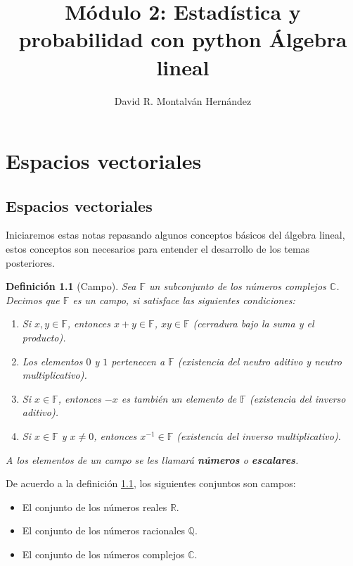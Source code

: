 \documentclass[11pt]{report}
\title{Módulo 2: Estadística y probabilidad con python \newline Álgebra lineal}
\author{David R. Montalván Hernández}
\date{}
\theoremstyle{break}
\newtheorem{definicion}{Definición}[chapter]
\theoremstyle{break}
\begin{document}
\sloppy %
\maketitle
\renewcommand{\contentsname}{Contenido}
\tableofcontents
\renewcommand{\listfigurename}{Lista de imágenes}
\listoffigures
\renewcommand{\listtablename}{Lista de tablas}
\renewcommand\tablename{Tabla}
\renewcommand{\bibname}{Referencias}
\renewcommand{\figurename}{Figura}
\renewcommand{\chaptername}{Capítulo}
\listoftables

\chapter{Espacios vectoriales}
\label{capitulo:espacios-vectoriales}
\section{Espacios vectoriales}
\label{seccion:espacios-vectoriales}
Iniciaremos estas notas repasando algunos conceptos básicos del álgebra lineal, estos conceptos son necesarios para entender el desarrollo de los temas posteriores.

\begin{definicion}[Campo]
\label{definicion:campo}
Sea $\mathbb{F}$ un subconjunto de los números complejos $\mathbb{C}$. Decimos que $\mathbb{F}$ es un campo, si satisface las siguientes condiciones:

\begin{enumerate}
\item Si $x,y \in \mathbb{F}$, entonces $x + y \in \mathbb{F}$, $xy \in \mathbb{F}$ (cerradura bajo la suma y el producto).
\item Los elementos $0$ y $1$ pertenecen a $\mathbb{F}$ (existencia del neutro aditivo y neutro multiplicativo).
\item Si $x \in \mathbb{F}$, entonces $-x$ es también un elemento de $\mathbb{F}$ (existencia del inverso aditivo).
\item Si $x \in \mathbb{F}$ y $x \neq 0$, entonces $x^{-1} \in \mathbb{F}$ (existencia del inverso multiplicativo).
\end{enumerate}

A los elementos de un campo se les llamará \textbf{números} o \textbf{escalares}.
\end{definicion}

De acuerdo a la definición \ref{definicion:campo}, los siguientes conjuntos son campos:
\begin{itemize}
\item El conjunto de los números reales $\mathbb{R}$.
\item El conjunto de los números racionales $\mathbb{Q}$.
\item El conjunto de los números complejos $\mathbb{C}$.
\end{itemize}
\end{document}

